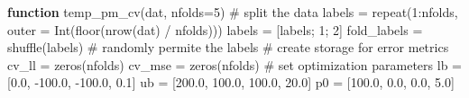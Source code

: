 \documentclass[
  letterpaper,
  DIV=11,
  numbers=noendperiod]{scrartcl}
\newenvironment{Shaded}{\begin{snugshade}}{\end{snugshade}}
\newcommand{\CommentTok}[1]{\textcolor[rgb]{0.37,0.37,0.37}{#1}}
\newcommand{\FloatTok}[1]{\textcolor[rgb]{0.68,0.00,0.00}{#1}}
\newcommand{\FunctionTok}[1]{\textcolor[rgb]{0.28,0.35,0.67}{#1}}
\newcommand{\KeywordTok}[1]{\textcolor[rgb]{0.00,0.23,0.31}{\textbf{#1}}}
\newcommand{\NormalTok}[1]{\textcolor[rgb]{0.00,0.23,0.31}{#1}}
\newcommand{\OperatorTok}[1]{\textcolor[rgb]{0.37,0.37,0.37}{#1}}
\newcommand*\circled[1]{\tikz[baseline=(char.base)]{
          \node[shape=circle,draw,inner sep=1pt] (char) {{\scriptsize#1}};}}
\begin{document}
\begin{Shaded}
\begin{Highlighting}[]
\KeywordTok{function} \FunctionTok{temp\_pm\_cv}\NormalTok{(dat, nfolds}\OperatorTok{=}\FloatTok{5}\NormalTok{)}
    \CommentTok{\# split the data}
\NormalTok{    labels }\OperatorTok{=} \FunctionTok{repeat}\NormalTok{(}\FloatTok{1}\OperatorTok{:}\NormalTok{nfolds, outer }\OperatorTok{=} \FunctionTok{Int}\NormalTok{(}\FunctionTok{floor}\NormalTok{(}\FunctionTok{nrow}\NormalTok{(dat) }\OperatorTok{/}\NormalTok{ nfolds))) }\hspace*{\fill}\NormalTok{\circled{1}}
\NormalTok{    labels }\OperatorTok{=}\NormalTok{ [labels; }\FloatTok{1}\NormalTok{; }\FloatTok{2}\NormalTok{] }
\NormalTok{    fold\_labels }\OperatorTok{=} \FunctionTok{shuffle}\NormalTok{(labels) }\CommentTok{\# randomly permite the labels}
    \CommentTok{\# create storage for error metrics}
\NormalTok{    cv\_ll }\OperatorTok{=} \FunctionTok{zeros}\NormalTok{(nfolds)}
\NormalTok{    cv\_mse }\OperatorTok{=} \FunctionTok{zeros}\NormalTok{(nfolds)}
    \CommentTok{\# set optimization parameters}
\NormalTok{    lb }\OperatorTok{=}\NormalTok{ [}\FloatTok{0.0}\NormalTok{, }\OperatorTok{{-}}\FloatTok{100.0}\NormalTok{, }\OperatorTok{{-}}\FloatTok{100.0}\NormalTok{, }\FloatTok{0.1}\NormalTok{]}
\NormalTok{    ub }\OperatorTok{=}\NormalTok{ [}\FloatTok{200.0}\NormalTok{, }\FloatTok{100.0}\NormalTok{, }\FloatTok{100.0}\NormalTok{, }\FloatTok{20.0}\NormalTok{]}
\NormalTok{    p0 }\OperatorTok{=}\NormalTok{ [}\FloatTok{100.0}\NormalTok{, }\FloatTok{0.0}\NormalTok{, }\FloatTok{0.0}\NormalTok{, }\FloatTok{5.0}\NormalTok{]}


\end{Highlighting}
\end{Shaded}
\end{document}
